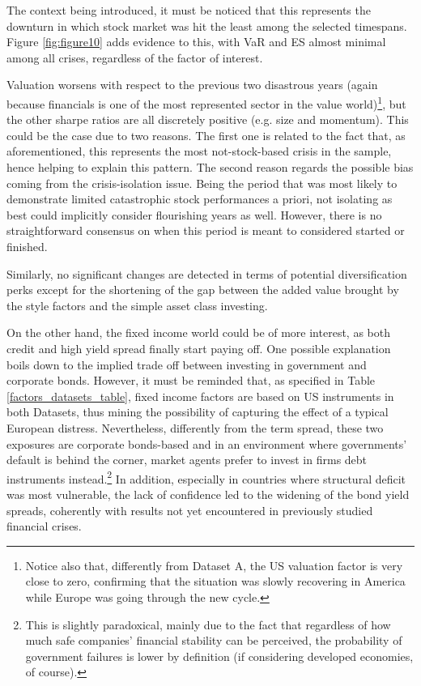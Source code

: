 \documentclass[12pt]{article}
\begin{document}
The context being introduced, it must be noticed that this represents the downturn in which stock market was hit the least  among the selected timespans. Figure \ref{fig:figure10} adds evidence to this, with VaR and ES almost minimal among all crises, regardless of the factor of interest.

Valuation worsens with respect to the previous two disastrous years (again because financials is one of the most represented sector in the value world)\footnote{Notice also that, differently from Dataset A, the US valuation factor is very close to zero, confirming that the situation was slowly recovering in America while Europe was going through the new cycle.}, but the other sharpe ratios are all discretely positive (e.g. size and momentum). This could be the case due to two reasons. The first one is related to the fact that, as aforementioned, this represents the most not-stock-based crisis in the sample, hence helping to explain this pattern. The second reason regards the possible bias coming from the crisis-isolation issue. Being the period that was most likely to demonstrate limited catastrophic stock performances a priori, not isolating as best could implicitly consider flourishing years as well. However, there is no straightforward consensus on when this period is meant to considered started or finished.

Similarly, no significant changes are detected in terms of potential diversification perks except for the shortening of the gap between the added value brought by the style factors and the simple asset class investing.

On the other hand, the fixed income world could be of more interest, as both credit and high yield spread finally start paying off. One possible explanation boils down to the implied trade off between investing in government and corporate bonds. However, it must be reminded that, as specified in Table \ref{factors_datasets_table}, fixed income factors are based on US instruments in both Datasets, thus mining the possibility of capturing the effect of a typical European distress. Nevertheless, differently from the term spread, these two exposures are corporate bonds-based and in an environment where governments' default is behind the corner, market agents prefer to invest in firms debt instruments instead.\footnote{This is slightly paradoxical, mainly due to the fact that regardless of how much safe companies' financial stability can be perceived, the probability of government failures is lower by definition (if considering developed economies, of course).} In addition, especially in countries where structural deficit was most vulnerable, the lack of confidence led to the widening of the bond yield spreads, coherently with results not yet encountered in previously studied financial crises. 
\end{document}
